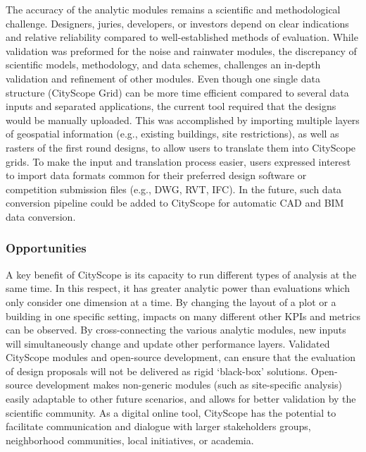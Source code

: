 {{        {
            The accuracy of the analytic modules remains a scientific and methodological challenge. Designers, juries, developers, or investors depend on clear indications and relative reliability compared to well-established methods of evaluation. While validation was preformed for the noise and rainwater modules, the discrepancy of scientific models, methodology, and data schemes, challenges an in-depth validation and refinement of other modules.
            \newline
            Even though one single data structure (CityScope Grid) can be more time efficient compared to several data inputs and separated applications, the current tool required that the designs would be manually uploaded. This was accomplished by importing multiple layers of geospatial information (e.g., existing buildings, site restrictions), as well as rasters of the first round designs, to allow users to translate them into CityScope grids. To make the input and translation process easier, users expressed interest to import data formats common for their preferred design software or competition submission files (e.g., DWG, RVT, IFC). In the future, such data conversion pipeline could be added to CityScope for automatic CAD and BIM data conversion.
        }

        \subsubsection{Opportunities}
        {
            A key benefit of CityScope is its capacity to run different types of analysis at the same time. In this respect, it has greater analytic power than evaluations which only consider one dimension at a time. By changing the layout of a plot or a building in one specific setting, impacts on many different other KPIs and metrics can be observed. By cross-connecting the various analytic modules, new inputs will simultaneously change and update other performance layers.
            \newline
            Validated CityScope modules and open-source development, can ensure that the evaluation of design proposals will not be delivered as rigid `black-box' solutions. Open-source development makes non-generic modules (such as site-specific analysis) easily adaptable to other future scenarios, and allows for better validation by the scientific community. As a digital online tool, CityScope has the potential to facilitate communication and dialogue with larger stakeholders groups, neighborhood communities, local initiatives, or academia.
        }

}}
